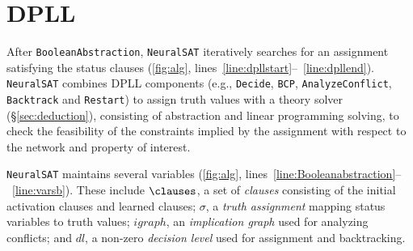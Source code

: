 \documentclass[oneside,11pt,dvipsnames]{book}
\numberwithin{equation}{section}
\theoremstyle{definition}
\theoremstyle{remark}
\newcommand{\tvn}[1]{\iftoggle{usecomment}{{\color{red}{[TVN]: #1}}}{}}
\newcommand{\hd}[1]{\iftoggle{usecomment}{{\color{blue}{[HD]: #1}}}{}}
\newcommand{\tool}{\texttt{NeuralSAT}}
\begin{document}



\section{DPLL}\label{sec:dpll}

After \texttt{BooleanAbstraction}, \tool{} iteratively searches for an assignment satisfying the status clauses (\autoref{fig:alg}, lines~\ref{line:dpllstart}--~\ref{line:dpllend}).
\tool{} combines  DPLL components (e.g., \texttt{Decide}, \texttt{BCP}, \texttt{AnalyzeConflict}, \texttt{Backtrack} and \texttt{Restart}) to assign truth values with a theory solver (\S\ref{sec:deduction}), consisting of abstraction and linear programming solving, to check the feasibility of the constraints implied by the assignment with respect to the network and property of interest.

\tool{} maintains several variables (\autoref{fig:alg}, lines~\ref{line:Booleanabstraction}--~\ref{line:varsb}). These include $\clauses$, a set of \emph{clauses} consisting of the initial activation clauses and learned clauses;   $\sigma$, a \emph{truth assignment} mapping status variables to truth values; $igraph$, an \emph{implication graph} used for analyzing conflicts; and  $dl$, a non-zero \emph{decision level} used for assignment and backtracking.



\end{document}
